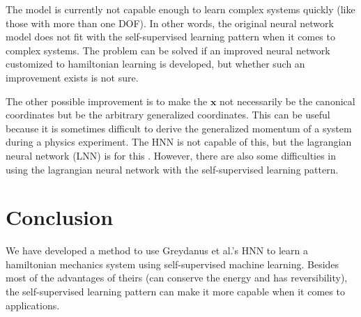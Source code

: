 \documentclass{article}
\begin{document}
The model is currently not capable enough to learn complex systems quickly
(like those with more than one DOF).
In other words, the original neural network model does not fit with the self-supervised learning pattern when it comes to complex systems.
The problem can be solved if an improved neural network customized to hamiltonian learning is developed,
but whether such an improvement exists is not sure.

The other possible improvement is to make the $\mathbf x$ not necessarily be the canonical coordinates but be the arbitrary generalized coordinates.
This can be useful because it is sometimes difficult to derive the generalized momentum of a system during a physics experiment.
The HNN is not capable of this, but the lagrangian neural network (LNN) is for this \cite{cranmer2020lagrangian}.
However, there are also some difficulties in using the lagrangian neural network with the self-supervised learning pattern.

\section{Conclusion}

We have developed a method to use Greydanus et al.'s HNN \cite{greydanus2019hamiltonian}
to learn a hamiltonian mechanics system using self-supervised machine learning.
Besides most of the advantages of theirs (can conserve the energy and has reversibility),
the self-supervised learning pattern can make it more capable when it comes to applications.



\end{document}
